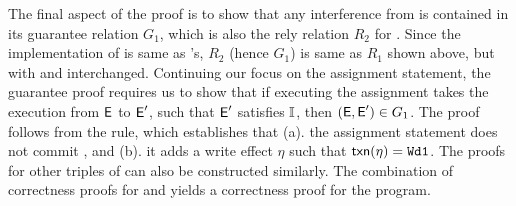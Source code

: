 The final aspect of the proof is to show that any interference from
 is contained in its guarantee relation $G_1$, which is also
the rely relation $R_2$ for . Since the implementation of
 is same as 's, $R_2$ (hence $G_1$) is same as $R_1$
shown above, but with  and  interchanged. Continuing our
focus on the assignment statement, the guarantee proof requires us to
show that if executing the assignment takes the execution from $\textsf{E}$ to
$\textsf{E}'$, such that $\textsf{E}'$ satisfies $\mathbb{I}$, then $(\textsf{E},\textsf{E}') \in G_1$.  The
proof follows from the  rule, which establishes
that (a). the assignment statement does not commit , and (b).
it adds a write effect $\eta$ such that $\textsf{txn}(\eta)={\tt Wd1}$.  The
proofs for other triples of  can also be constructed
similarly. The combination of correctness proofs for  and
 yields a correctness proof for the program.


